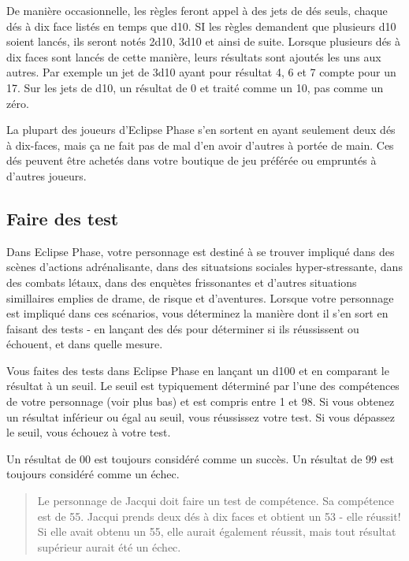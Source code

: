 De manière occasionnelle, les règles feront appel à des jets de dés seuls, chaque dés à dix face listés en temps que d10. SI les règles demandent que plusieurs d10 soient lancés, ils seront notés 2d10, 3d10 et ainsi de suite. Lorsque plusieurs dés à dix faces sont lancés de cette manière, leurs résultats sont ajoutés les uns aux autres. Par exemple un jet de 3d10 ayant pour résultat 4, 6 et 7 compte pour un 17. Sur les jets de d10, un résultat de 0 et traité comme un 10, pas comme un zéro. 

La plupart des joueurs d'Eclipse Phase s'en sortent en ayant seulement deux dés à dix-faces, mais ça ne fait pas de mal d'en avoir d'autres à portée de main. Ces dés peuvent être achetés dans votre boutique de jeu préférée ou empruntés à d'autres joueurs. 

\subsection{Faire des test} \label{sec:making-tests} 

Dans Eclipse Phase, votre personnage est destiné à se trouver impliqué dans des scènes d'actions adrénalisante, dans des situatsions sociales hyper-stressante, dans des combats létaux, dans des enquètes frissonantes et d'autres situations simillaires emplies de drame, de risque et d'aventures. Lorsque votre personnage est impliqué dans ces scénarios, vous déterminez la manière dont il s'en sort en faisant des tests - en lançant des dés pour déterminer si ils réussissent ou échouent, et dans quelle mesure. 

Vous faites des tests dans Eclipse Phase en lançant un d100 et en comparant le résultat à un seuil. Le seuil est typiquement déterminé par l'une des compétences de votre personnage (voir plus bas) et est compris entre 1 et 98. Si vous obtenez un résultat inférieur ou égal au seuil, vous réussissez votre test. Si vous dépassez le seuil, vous échouez à votre test. 

Un résultat de 00 est toujours considéré comme un succès. Un résultat de 99 est toujours considéré comme un échec. 

\begin{quotation} Le personnage de Jacqui doit faire un test de compétence. Sa compétence est de 55. Jacqui prends deux dés à dix faces et obtient un 53 - elle réussit! Si elle avait obtenu un 55, elle aurait également réussit, mais tout résultat supérieur aurait été un échec. \end{quotation} 


